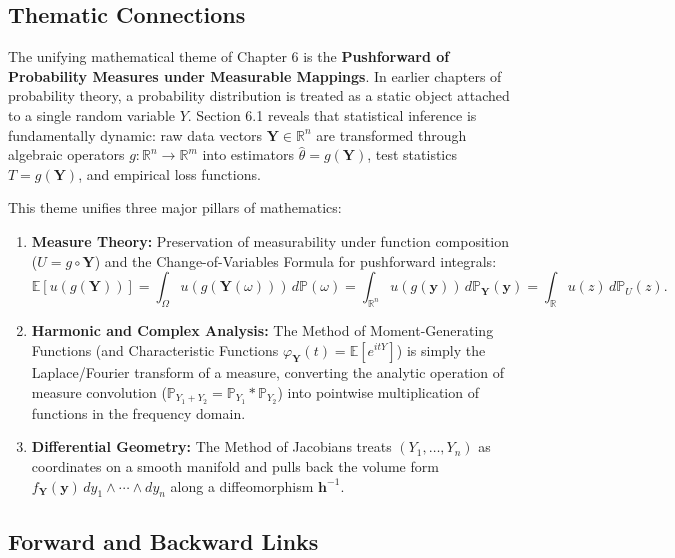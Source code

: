 \documentclass[11pt, letterpaper]{article}
\theoremstyle{definition}
\theoremstyle{remark}
\newcommand{\R}{\mathbb{R}}
\newcommand{\E}{\mathbb{E}}
\newcommand{\Prob}{\mathbb{P}}
\begin{document}
\subsection{Thematic Connections}

The unifying mathematical theme of Chapter 6 is the \textbf{Pushforward of Probability Measures under Measurable Mappings}. In earlier chapters of probability theory, a probability distribution is treated as a static object attached to a single random variable $Y$. Section 6.1 reveals that statistical inference is fundamentally dynamic: raw data vectors $\mathbf{Y} \in \R^n$ are transformed through algebraic operators $g : \R^n \to \R^m$ into estimators $\hat{\theta} = g(\mathbf{Y})$, test statistics $T = g(\mathbf{Y})$, and empirical loss functions.

This theme unifies three major pillars of mathematics:
\begin{enumerate}[label=\arabic*.]
    \item \textbf{Measure Theory:} Preservation of measurability under function composition ($U = g \circ \mathbf{Y}$) and the Change-of-Variables Formula for pushforward integrals:
    \[
        \E[u(g(\mathbf{Y}))] = \int_{\Omega} u(g(\mathbf{Y}(\omega))) \, d\Prob(\omega) = \int_{\R^n} u(g(\mathbf{y})) \, d\Prob_{\mathbf{Y}}(\mathbf{y}) = \int_{\R} u(z) \, d\Prob_U(z).
    \]
    \item \textbf{Harmonic and Complex Analysis:} The Method of Moment-Generating Functions (and Characteristic Functions $\varphi_{\mathbf{Y}}(t) = \E[e^{itY}]$) is simply the Laplace/Fourier transform of a measure, converting the analytic operation of measure convolution ($\Prob_{Y_1 + Y_2} = \Prob_{Y_1} * \Prob_{Y_2}$) into pointwise multiplication of functions in the frequency domain.
    \item \textbf{Differential Geometry:} The Method of Jacobians treats $(Y_1, \dots, Y_n)$ as coordinates on a smooth manifold and pulls back the volume form $f_{\mathbf{Y}}(\mathbf{y}) \, dy_1 \wedge \cdots \wedge dy_n$ along a diffeomorphism $\mathbf{h}^{-1}$.
\end{enumerate}

\subsection{Forward and Backward Links}
\end{document}
